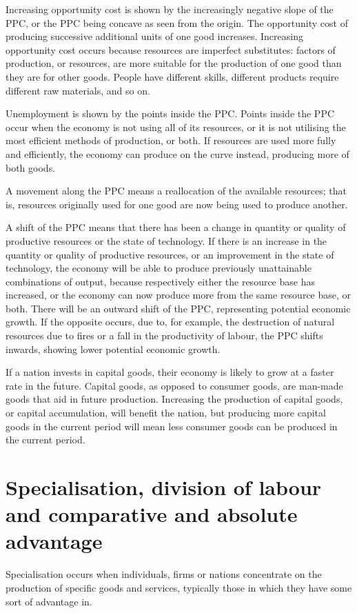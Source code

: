 \documentclass[Economics.tex]{subfiles}
\begin{document}
Increasing opportunity cost is shown by the increasingly negative slope of the PPC, or the PPC being concave as seen from the origin. The opportunity cost of producing successive additional units of one good increases. Increasing opportunity cost occurs because resources are imperfect substitutes: factors of production, or resources, are more suitable for the production of one good than they are for other goods. People have different skills, different products require different raw materials, and so on.

Unemployment is shown by the points inside the PPC. Points inside the PPC occur when the economy is not using all of its resources, or it is not utilising the most efficient methods of production, or both. If resources are used more fully and efficiently, the economy can produce on the curve instead, producing more of both goods.

A movement along the PPC means a reallocation of the available resources; that is, resources originally used for one good are now being used to produce another.

A shift of the PPC means that there has been a change in quantity or quality of productive resources or the state of technology. If there is an increase in the quantity or quality of productive resources, or an improvement in the state of technology, the economy will be able to produce previously unattainable combinations of output, because respectively either the resource base has increased, or the economy can now produce more from the same resource base, or both. There will be an outward shift of the PPC, representing potential economic growth. If the opposite occurs, due to, for example, the destruction of natural resources due to fires or a fall in the productivity of labour, the PPC shifts inwards, showing lower potential economic growth.

If a nation invests in capital goods, their economy is likely to grow at a faster rate in the future. Capital goods, as opposed to consumer goods, are man-made goods that aid in future production. Increasing the production of capital goods, or capital accumulation, will benefit the nation, but producing more capital goods in the current period will mean less consumer goods can be produced in the current period.
\section{Specialisation, division of labour and comparative and absolute advantage}
Specialisation occurs when individuals, firms or nations concentrate on the production of specific goods and services, typically those in which they have some sort of advantage in.
\end{document}
